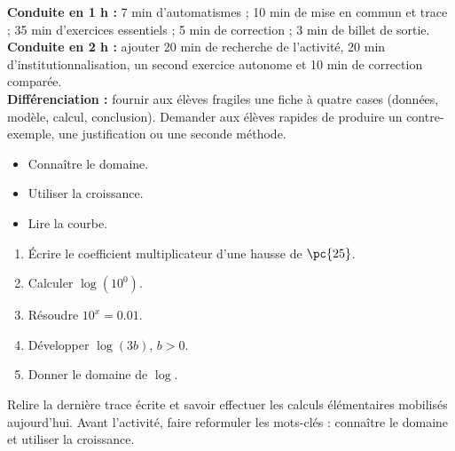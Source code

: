 \ifmxteacher
\begin{method}
\textbf{Conduite en 1 h :} 7 min d'automatismes ; 10 min de mise en commun et trace ; 35 min d'exercices essentiels ; 5 min de correction ; 3 min de billet de sortie.\\
\textbf{Conduite en 2 h :} ajouter 20 min de recherche de l'activité, 20 min d'institutionnalisation, un second exercice autonome et 10 min de correction comparée.\\
\textbf{Différenciation :} fournir aux élèves fragiles une fiche à quatre cases (données, modèle, calcul, conclusion). Demander aux élèves rapides de produire un contre-exemple, une justification ou une seconde méthode.
\end{method}
\fi
{}
\begin{objectives}\begin{itemize}\item Connaître le domaine.\item Utiliser la croissance.\item Lire la courbe.\end{itemize}\end{objectives}
\begin{fluency}\begin{enumerate}\item Écrire le coefficient multiplicateur d'une hausse de $\pc{25}$. \item Calculer $\log(10^0)$. \item Résoudre $10^x=\num{0,01}$. \item Développer $\log(3b)$, $b>0$. \item Donner le domaine de $\log$. \mxblank{$]0,+\infty[$}\end{enumerate}\end{fluency}
\begin{prerequisites}Relire la dernière trace écrite et savoir effectuer les calculs élémentaires mobilisés aujourd'hui. Avant l'activité, faire reformuler les mots-clés : connaître le domaine et utiliser la croissance.\end{prerequisites}

